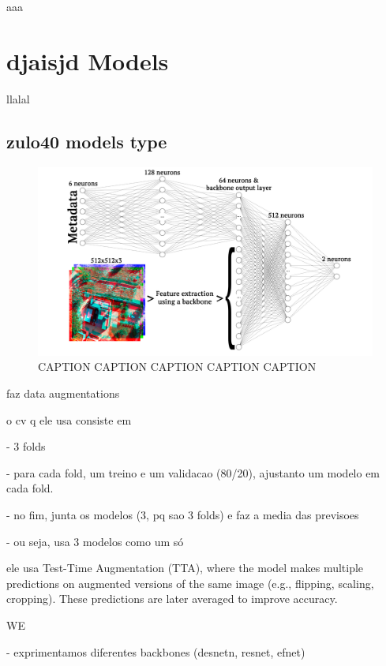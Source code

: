\documentclass[conference]{IEEEtran}
\begin{document}
aaa


\section{djaisjd Models}

llalal


\subsection{zulo40 models type}


\begin{figure}[H]
    \centering
    \includegraphics[width=1\linewidth]{assets/nn.png}
    \caption{CAPTION CAPTION CAPTION CAPTION CAPTION}
    \label{fig:nn}
\end{figure}

faz data augmentations

o cv q ele usa consiste em

- 3 folds

- para cada fold, um treino e um validacao (80/20), ajustanto um modelo em cada fold.

- no fim, junta os modelos (3, pq sao 3 folds) e faz a media das previsoes

- ou seja, usa 3 modelos como um só

ele usa Test-Time Augmentation (TTA), where the model makes multiple predictions on augmented versions of the same image (e.g., flipping, scaling, cropping). These predictions are later averaged to improve accuracy.

WE

- exprimentamos diferentes backbones (desnetn, resnet, efnet)
\end{document}
